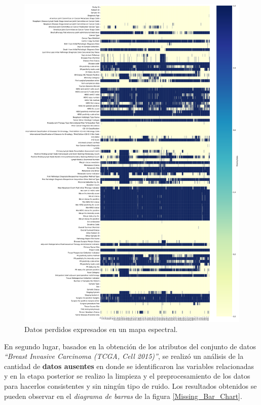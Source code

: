 \begin{figure}[!htb]
	\centering
	\includegraphics[width=1
	\linewidth]{NOTEBOOK/IMAGENES_PERDIDAS/missing_heatmap}
	\caption{Datos perdidos expresados en un mapa espectral.}
	\label{Missing_Spectrum}
\end{figure}


\clearpage
En segundo lugar, basados en la obtención de los atributos del conjunto de datos \textit{“Breast Invasive Carcinoma (TCGA, Cell 2015)”}, se realizó un análisis de la cantidad de \textbf{datos ausentes} en donde se  identificaron las variables relacionadas y en la etapa posterior se realizo la limpieza y el preprocesamiento de los datos para hacerlos consistentes y sin ningún tipo de ruido. Los resultados obtenidos se pueden observar en el \textit{diagrama de barras} de la figura \ref{Missing_Bar_Chart}. 

